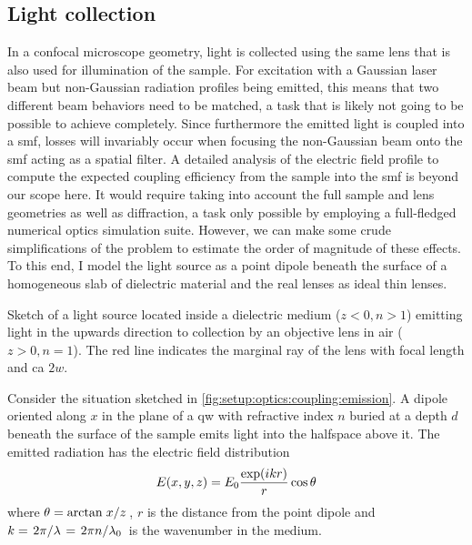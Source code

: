 \subsection{Light collection}\label{sec:setup:optics:coupling:detection}
In a confocal microscope geometry, light is collected using the same lens that is also used for illumination of the sample.
For excitation with a Gaussian laser beam but non-Gaussian radiation profiles being emitted, this means that two different beam behaviors need to be matched, a task that is likely not going to be possible to achieve completely.
Since furthermore the emitted light is coupled into a \gls{smf}, losses will invariably occur when focusing the non-Gaussian beam onto the \gls{smf} acting as a spatial filter.
A detailed analysis of the electric field profile to compute the expected coupling efficiency from the sample into the \gls{smf} is beyond our scope here.
It would require taking into account the full sample and lens geometries as well as diffraction, a task only possible by employing a full-fledged numerical optics simulation suite.
However, we can make some crude simplifications of the problem to estimate the order of magnitude of these effects.
To this end, I model the light source as a point dipole beneath the surface of a homogeneous slab of dielectric material and the real lenses as ideal thin lenses.

\begin{marginfigure}
    
    \caption[]{
        Sketch of a light source located inside a dielectric medium ($z < 0, n > 1$) emitting light in the upwards direction to collection by an objective lens in air ($z > 0, n = 1$).
        The red line indicates the marginal ray of the lens with focal length \fob and \gls{ca} $2w$.
    }
    \label{fig:setup:optics:coupling:emission}
\end{marginfigure}

Consider the situation sketched in \cref{fig:setup:optics:coupling:emission}.
A dipole oriented along $x$ in the plane of a  \gls{qw} with refractive index $n$ buried at a depth $d$ beneath the surface of the sample emits light into the halfspace above it.
The emitted radiation has the electric field distribution
\begin{equation}\label{eq:setup:optics:coupling:efield}
    E(x,y,z) = E_{0}\frac{\exp(i k r)}{r}\cos\theta
\end{equation}
where $\theta=\arctan{\flatfrac{x}{z}}$, $r$ is the distance from the point dipole and $k=\flatfrac{2\pi}{\lambda}=\flatfrac{2\pi n}{\lambda_0}$ is the wavenumber in the medium.

